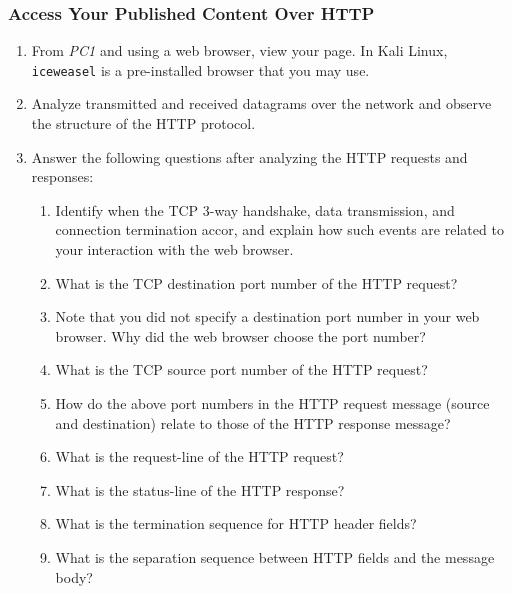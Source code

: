 \documentclass[pdftex,12pt,a4paper]{article}
\begin{document}
            \subsubsection{Access Your Published Content Over HTTP}
                \begin{enumerate}
                    \item From \emph{PC1} and using a web browser, view your
                    page. In Kali Linux, \texttt{iceweasel} is a pre-installed
                    browser that you may use.

                    \item Analyze transmitted and received datagrams over the
                    network and observe the structure of the HTTP protocol.

                    \item Answer the following questions after analyzing the
                    HTTP requests and responses:
                        \begin{enumerate}
                            \item Identify when the TCP 3-way handshake, data
                                transmission, and connection termination accor,
                                and explain how such events are related to your
                                interaction with the web browser.
                            \item What is the TCP destination port number of
                            the HTTP request?
                            \item Note that you did not specify a destination
                            port number in your web browser. Why did the web
                            browser choose the port number?
                            \item What is the TCP source port number of the
                            HTTP request?
                            \item How do the above port numbers in the HTTP
                            request message (source and destination) relate to
                            those of the HTTP response message?
                            \item What is the request-line of the HTTP request?
                            \item What is the status-line of the HTTP response?
                            \item What is the termination sequence for HTTP
                            header fields?
                            \item What is the separation sequence between HTTP
                            fields and the message body?
                        \end{enumerate}
                \end{enumerate}
\end{document}
